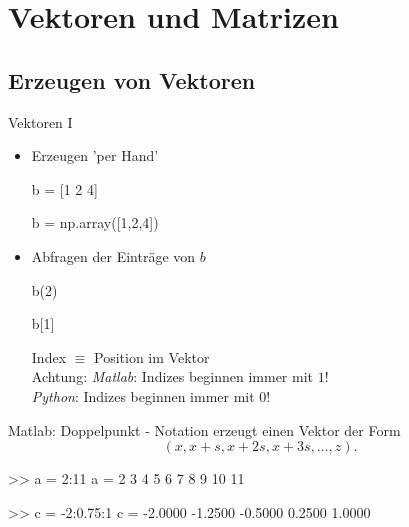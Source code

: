 \documentclass[hyperref={xetex}]{beamer}
\begin{document}
\section{Vektoren und Matrizen}



\subsection{Erzeugen von Vektoren}
%
%
\begin{frame}[fragile]{Vektoren I}
\begin{itemize}
\item Erzeugen 'per Hand'
\begin{matlabin}
b = [1 2 4]
\end{matlabin}
\begin{pyin}
b = np.array([1,2,4])
\end{pyin}

\item Abfragen der Einträge von $b$
\begin{matlabin}
b(2)
\end{matlabin}
\begin{pyin}
b[1]
\end{pyin}

Index $\equiv$ Position im Vektor\\

\alert{Achtung}: \emph{Matlab}: Indizes beginnen immer mit $1$!\\
\emph{Python}: Indizes beginnen immer mit $0$!

\end{itemize}
\end{frame}

%
\begin{frame}[fragile]{Matlab: Doppelpunkt - Notation}
 erzeugt einen Vektor der Form 
\[ (x,x+s,x+2s,x+3s, \ldots , z). \]
\begin{matlabin}
>> a = 2:11
a =
 2  3  4  5  6  7  8  9  10  11

>> c = -2:0.75:1
c =
 -2.0000 -1.2500 -0.5000 0.2500 1.0000
\end{matlabin}
\end{frame} 
\end{document}
